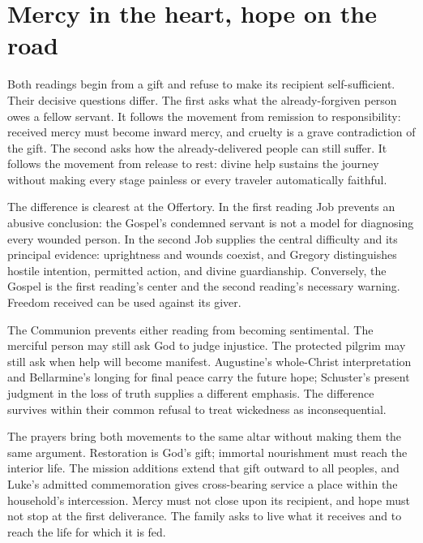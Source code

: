 \section{Mercy in the heart, hope on the road}
Both readings begin from a gift and refuse to make its recipient
self-sufficient. Their decisive questions differ. The first asks
what the already-forgiven person owes a fellow servant. It follows
the movement from remission to responsibility: received mercy must
become inward mercy, and cruelty is a grave contradiction of the gift.
The second asks how the already-delivered people can still suffer.
It follows the movement from release to rest: divine help sustains
the journey without making every stage painless or every traveler
automatically faithful.

The difference is clearest at the Offertory. In the first reading
Job prevents an abusive conclusion: the Gospel's condemned servant
is not a model for diagnosing every wounded person. In the second
Job supplies the central difficulty and its principal evidence:
uprightness and wounds coexist, and Gregory distinguishes hostile
intention, permitted action, and divine guardianship. Conversely,
the Gospel is the first reading's center and the second reading's
necessary warning. Freedom received can be used against its giver.

The Communion prevents either reading from becoming sentimental.
The merciful person may still ask God to judge injustice. The
protected pilgrim may still ask when help will become manifest.
Augustine's whole-Christ interpretation and Bellarmine's longing
for final peace carry the future hope; Schuster's present judgment
in the loss of truth supplies a different emphasis. The difference
survives within their common refusal to treat wickedness as
inconsequential.

The prayers bring both movements to the same altar without making
them the same argument. Restoration is God's gift; immortal
nourishment must reach the interior life. The mission additions
extend that gift outward to all peoples, and Luke's admitted
commemoration gives cross-bearing service a place within the
household's intercession. Mercy must not close upon its recipient,
and hope must not stop at the first deliverance. The family asks
to live what it receives and to reach the life for which it is fed.

\clearpage
